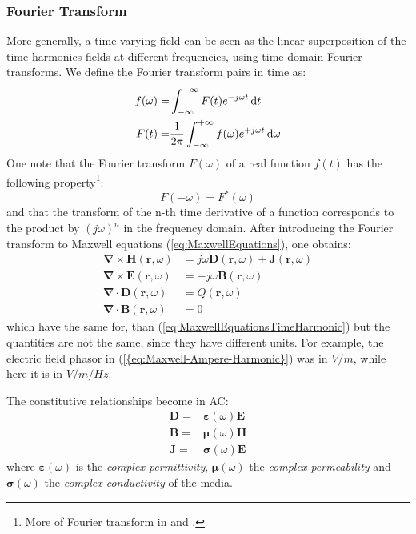 \subsubsection{Fourier Transform}
More generally, a time-varying field can be seen as the linear superposition of the time-harmonics fields at different frequencies, using time-domain Fourier transforms. We define the Fourier transform pairs in time as:
\begin{subequations}
	\begin{align}
	f(\omega) =& \int_{-\infty}^{+\infty} F(t) e^{-j\omega t} \mathop{}\!\mathrm{d} t \\
	F(t) =& \frac{1}{2\pi}\int_{-\infty}^{+\infty} f(\omega) e^{+j\omega t} \mathop{}\!\mathrm{d} \omega
	\end{align}
	\label{eq:FourierTransformTime}
\end{subequations}
One note that the Fourier transform $F(\omega)$ of a real function $f(t)$ has the following property\footnote{More of Fourier transform in \parencite[sec.1.3]{Clemmow1996} and \parencite[chap.4]{Harrington2001}.}:
\begin{equation}
	F(-\omega) = F^*(\omega)
\end{equation}
and that the transform of the n-th time derivative of a function corresponds to the product by $(j \omega)^n$ in the frequency domain. After introducing the Fourier transform to Maxwell equations (\ref{eq:MaxwellEquations}), one obtains\parencite[sec.1.7.5]{Smith1997}:
\begin{subequations}
	\begin{align}
	\boldsymbol{\nabla} \times \mathbf{H}(\mathbf{r}, \omega) &= j\omega\mathbf{D}(\mathbf{r}, \omega) + \mathbf{J}(\mathbf{r}, \omega)   \\
	\boldsymbol{\nabla} \times \mathbf{E}(\mathbf{r}, \omega) &= -j\omega\mathbf{B}(\mathbf{r}, \omega)  \\
	\boldsymbol{\nabla} \cdot \mathbf{D}(\mathbf{r}, \omega) &= Q(\mathbf{r}, \omega)  \\
	\boldsymbol{\nabla} \cdot \mathbf{B}(\mathbf{r}, \omega) &= 0  
	\end{align}
\end{subequations}
which have the same for, than (\ref{eq:MaxwellEquationsTimeHarmonic}) but the quantities are not the same, since they have different units. For example, the electric field phasor in (\ref{{eq:Maxwell-Ampere-Harmonic}}) was in $V/m$, while here it is in $V/m/Hz$.

The constitutive relationships become in AC:
\begin{subequations}
	\begin{align}
	\mathbf{D} =& \boldsymbol{\varepsilon}(\omega) \mathbf{E} \\
	\mathbf{B} =& \boldsymbol{\mu}(\omega) \mathbf{H} \\
	\mathbf{J} =& \boldsymbol{\sigma}(\omega) \mathbf{E}
	\end{align}
\end{subequations}
where $\boldsymbol{\varepsilon}(\omega)$ is the \emph{complex permittivity}, $\boldsymbol{\mu}(\omega)$ the \emph{complex permeability} and $\boldsymbol{\sigma}(\omega)$ the \emph{complex conductivity} of the media. 


